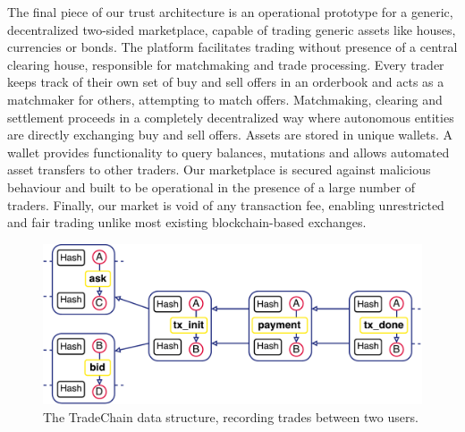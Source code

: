 \documentclass[USenglish]{article}
\begin{document}
The final piece of our trust architecture is an operational prototype for a generic, decentralized two-sided marketplace, capable of trading generic assets like houses, currencies or bonds.
The platform facilitates trading without presence of a central clearing house, responsible for matchmaking and trade processing.
Every trader keeps track of their own set of buy and sell offers in an orderbook and acts as a matchmaker for others, attempting to match offers.
Matchmaking, clearing and settlement proceeds in a completely decentralized way where autonomous entities are directly exchanging buy and sell offers.
Assets are stored in unique wallets.
A wallet provides functionality to query balances, mutations and allows automated asset transfers to other traders.
Our marketplace is secured against malicious behaviour and built to be operational in the presence of a large number of traders.
Finally, our market is void of any transaction fee, enabling unrestricted and fair trading unlike most existing blockchain-based exchanges.

\begin{figure}[t]
	\centering
	\includegraphics[width=.9\columnwidth]{assets/tradechain}
	\caption{The TradeChain data structure, recording trades between two users.}
	\label{fig:tradechain}
\end{figure}
\end{document}
